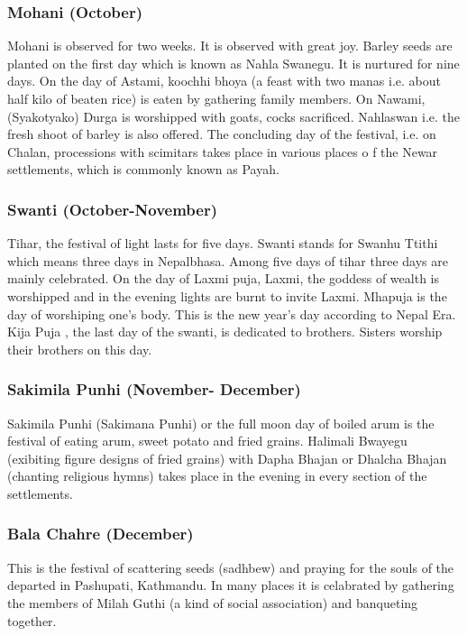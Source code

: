 \documentclass[a4paper,13pt, margin=0.9in]{article}
\begin{document}
\begin{flushleft}
	\subsubsection{Mohani (October)}

	Mohani is observed for two weeks. It is observed with great joy. Barley seeds are planted on the first day which is known as Nahla Swanegu. It is nurtured for nine days. On the day of Astami, koochhi bhoya (a feast with two manas i.e. about half kilo of beaten rice) is eaten by gathering family members. On Nawami, (Syakotyako) Durga is worshipped with goats, cocks sacrificed. Nahlaswan i.e. the fresh shoot of barley is also offered. The concluding day of the festival, i.e. on Chalan, processions with scimitars takes place in various places o f the Newar settlements, which is commonly known as Payah.

	\subsubsection{Swanti (October-November)}

	Tihar, the festival of light lasts for five days. Swanti stands for Swanhu Ttithi which means three days in Nepalbhasa. Among five days of tihar three days are mainly celebrated. On the day of Laxmi puja, Laxmi, the goddess of wealth is worshipped and in the evening lights are burnt to invite Laxmi. Mhapuja is the day of worshiping one's body. This is the new year's day according to Nepal Era. Kija Puja , the last day of the swanti, is dedicated to brothers. Sisters worship their brothers on this day.

	\subsubsection{Sakimila Punhi (November- December)}

	Sakimila Punhi (Sakimana Punhi) or the full moon day of boiled arum is the festival of eating arum, sweet potato and fried grains. Halimali Bwayegu (exibiting figure designs of fried grains) with Dapha Bhajan or Dhalcha Bhajan (chanting religious hymns) takes place in the evening in every section of the settlements.

	\subsubsection{Bala Chahre (December)}

	This is the festival of scattering seeds (sadhbew) and praying for the souls of the departed in Pashupati, Kathmandu. In many places it is celabrated by gathering the members of Milah Guthi (a kind of social association) and banqueting together.


\end{flushleft}
\end{document}
